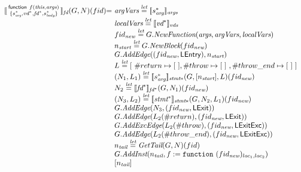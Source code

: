 \[\begin{array}{l@{}l@{~}l}
\transfun{\irfundeclsmall{f}{\emph{this}}{\emph{args}}{s_{\emph{arg}}^*}{\emph{vd}^*}{\emph{fd}^*}{s_{\emph{body}}^*}}_{\emph{fd}}(G,N)(fid) & = &
	\argVars \letval \transfun{s_{\emph{arg}}^*}_{\emph{args}} \\
	& & \localVars \letval \transfun{\emph{vd}^*}_{\emph{vds}} \\
	& & fid_{\emph{new}} \letval G.\emph{NewFunction}(\emph{args}, \argVars, \localVars)\\
	& & n_{\emph{start}} \letval G.\emph{NewBlock}(fid_{\emph{new}})\\
	& & G.\emph{AddEdge}((fid_{\emph{new}},\LEntry), n_{\emph{start}})\\
	& & L \letval [\ \#return \mapsto [\ ], \#throw \mapsto [\ ]\ , \#throw\_end \mapsto [\ ]\ ] \\
	& & (N_1,L_1) \letval \transfun{s_{\emph{arg}}^*}_{\emph{stmt}*}(G,[n_{\emph{start}}],L)(fid_{\emph{new}})\\
	& & N_2 \letval \transfun{\emph{fd}^*}_{\emph{fd}^*}(G,N_1)(fid_{\emph{new}})\\
	& & (N_3,L_2) \letval \transfun{\emph{stmt}^*}_{\emph{stmt}*}(G,N_2,L_1)(fid_{\emph{new}})\\
	& & G.\emph{AddEdge}(N_3,(fid_{\emph{new}},\LExit))\\
	& & G.\emph{AddEdge}(L_2(\#return),(fid_{\emph{new}},\LExit))\\
	& & G.\emph{AddExcEdge}(L_2(\#throw),(fid_{\emph{new}},\LExitExc))\\
	& & G.\emph{AddEdge}(L_2(\#throw\_end),(fid_{\emph{new}},\LExitExc))\\
	& & n_{\emph{tail}} \letval \GetTail(G,N)(fid)\\
	& & G.\emph{AddInst}(n_{\emph{tail}},f := \TT{function}\ (fid_{\emph{new}})_{loc_1,loc_2})\\
	& & [n_{\emph{tail}}]\\
	& & \\
\end{array}
\]

